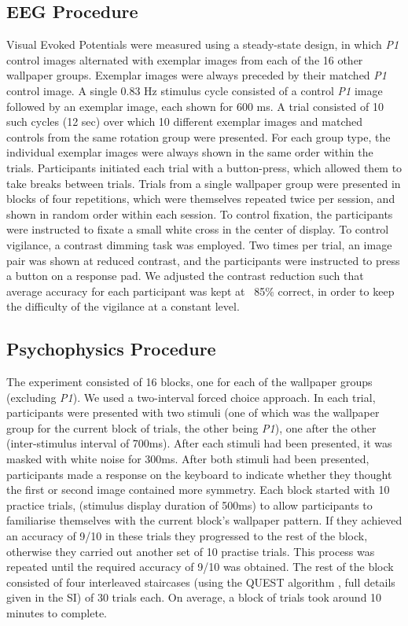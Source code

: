 \documentclass[9pt,twocolumn,twoside,lineno]{pnas-new}
\begin{document}
\subsection*{EEG Procedure}
Visual Evoked Potentials were measured using a steady-state design, in which \textit{P1} control images alternated with exemplar images from each of the 16 other wallpaper groups. Exemplar images were always preceded by their matched \textit{P1} control image. A single 0.83 Hz stimulus cycle consisted of a control \textit{P1} image followed by an exemplar image, each shown for 600 ms. A trial consisted of 10 such cycles (12 sec) over which 10 different exemplar images and matched controls from the same rotation group were presented. For each group type, the individual exemplar images were always shown in the same order within the trials. Participants initiated each trial with a button-press, which allowed them to take breaks between trials. Trials from a single wallpaper group were presented in blocks of four repetitions, which were themselves repeated twice per session, and shown in random order within each session. To control fixation, the participants were instructed to fixate a small white cross in the center of display. To control vigilance, a contrast dimming task was employed. Two times per trial, an image pair was shown at reduced contrast, and the participants were instructed to press a button on a response pad. We adjusted the contrast reduction such that average accuracy for each participant was kept at ~85\% correct, in order to keep the difficulty of the vigilance at a constant level.

\subsection*{Psychophysics Procedure}
The experiment consisted of 16 blocks, one for each of the wallpaper groups (excluding \textit{P1}). We used a two-interval forced choice approach. In each trial, participants were presented with two stimuli (one of which was the wallpaper group for the current block of trials, the other being \textit{P1}), one after the other (inter-stimulus interval of 700ms). After each stimuli had been presented, it was masked with white noise for 300ms. After both stimuli had been presented, participants made a response on the keyboard to indicate whether they thought the first or second image contained more symmetry. Each block started with 10 practice trials, (stimulus display duration of 500ms) to allow participants to familiarise themselves with the current block's wallpaper pattern. If they achieved an accuracy of 9/10 in these trials they progressed to the rest of the block, otherwise they carried out another set of 10 practise trials. This process was repeated until the required accuracy of 9/10 was obtained. The rest of the block consisted of four interleaved staircases (using the QUEST algorithm \cite{watson1983quest}, full details given in the SI) of 30 trials each. On average, a block of trials took around 10 minutes to complete. 
\end{document}
